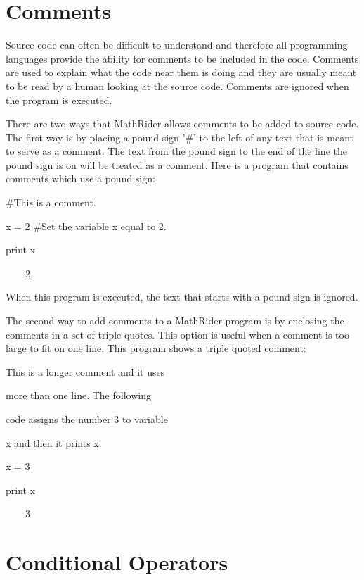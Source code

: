 \documentclass[12pt,oneside]{book}
\begin{document}
\section[Comments]{Comments}

Source code can often be difficult to understand and therefore all programming languages provide the ability for comments to be included in the code. Comments are used to explain what the code near them is doing and they are usually meant to be read by a human looking at the source code. Comments are ignored when the program is executed. 

There are two ways that MathRider allows comments to be added to source code. The first way is by placing a pound sign '\#' to the left of any text that is meant to serve as a comment. The text from the pound sign to the end of the line the pound sign is on will be treated as a comment. Here is a program that contains comments which use a pound sign: 

\#This is a comment.

x = 2 \#Set the variable x equal to 2.

print x

{\textbar}

\ \ \ \ 2


When this program is executed, the text that starts with a pound sign is ignored. 

The second way to add comments to a MathRider program is by enclosing the comments in a set of triple quotes. This option is useful when a comment is too large to fit on one line. This program shows a triple quoted comment: 

{\textquotedbl}{\textquotedbl}{\textquotedbl}

This is a longer comment and it uses

more than one line. The following

code assigns the number 3 to variable

x and then it prints x.

{\textquotedbl}{\textquotedbl}{\textquotedbl}


x = 3

print x 

{\textbar}

\ \ \ \ 3

\section[Conditional Operators]{Conditional Operators}
\end{document}
